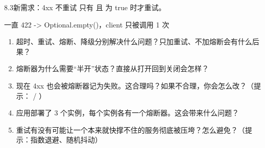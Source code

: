 \begin{task}{8.3\quad 新需求：4xx 不重试}
只有  且  为 true 时才重试。

\begin{example}
\begin{plaincode}
一直 422  ->  Optional.empty()，client 只被调用 1 次
\end{plaincode}
\end{example}
\end{task}

\begin{think}
\begin{enumerate}
  \item 超时、重试、熔断、降级分别解决什么问题？只加重试、不加熔断会有什么后果？
  \item 熔断器为什么需要“半开”状态？直接从打开回到关闭会怎样？
  \item 现在 4xx 也会被熔断器记为失败。这合理吗？如果不合理，你会怎么改？（提示： / ）
  \item 应用部署了 3 个实例，每个实例各有一个熔断器。这会带来什么问题？
  \item 重试有没有可能让一个本来就快撑不住的服务彻底被压垮？怎么避免？（提示：指数退避、随机抖动）
\end{enumerate}
\end{think}
